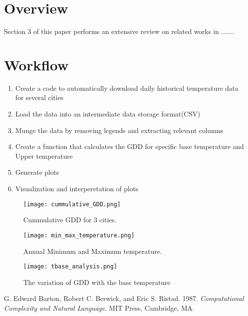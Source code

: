 \documentclass[12pt]{article}
\begin{document}
\noindent
\section{ \bf Overview}
Section 3 of this paper performs an extensive review on related works in .......


\section{\bf Workflow}

\begin{enumerate}
\item Create a code to automatically download daily historical temperature data for several cities
\item Load the data into an intermediate data storage format(CSV)
\item Munge the data by removing legends and extracting relevant columns
\item Create a function that calculates the GDD for specific base temperature and Upper temperature
\item Generate plots
\item Visualization and interperetation of plots
\end{enumerate}



\begin{figure}[h]
  \texttt{[image: cummulative\_GDD.png]}
  \caption{Cummulative GDD for 3 cities.}
 \texttt{[image: min\_max\_temperature.png]}
  \caption{Annual Minimum and Maximum temperature.}
 \texttt{[image: tbase\_analysis.png]}
  \caption{The variation of GDD with the base temperature}

\end{figure}









\begin{thebibliography}{99}

G. Edward Barton, Robert C. Berwick, and Eric S. Ristad. 1987. 
{\em Computational Complexity and Natural Language}. MIT Press, Cambridge, 
MA.



\end{thebibliography}
\end{document}
